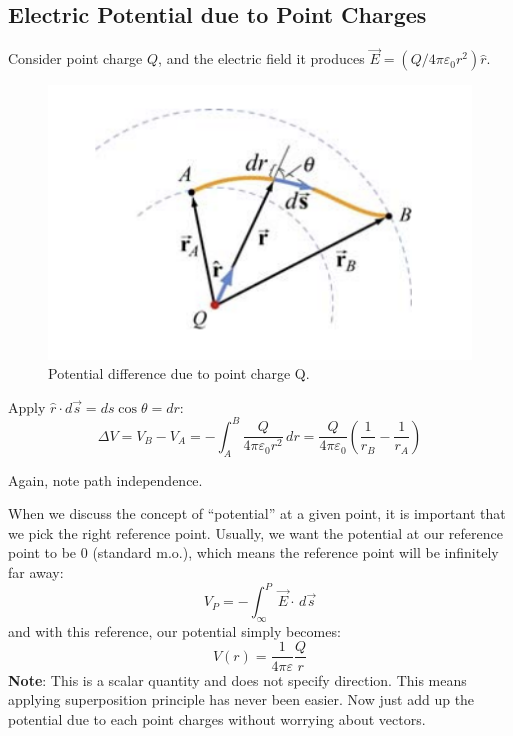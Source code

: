 \documentclass[11pt, letterpaper]{article}
\begin{document}
	\subsection{Electric Potential due to Point Charges}
	Consider point charge $Q$, and the electric field it produces $\vec{E} = (Q/4\pi
	\varepsilon_0r^2)\hat{r}$. 
	\begin{figure}[h!]
		\centering
		\includegraphics[scale=0.8]{single-charge-pot}
		\caption{Potential difference due to point charge Q.}
	\end{figure}
	
	Apply $\hat{r}\cdot d\vec{s} = ds\cos{\theta} = dr$:
	\begin{equation}\label{eqn:point-chagre-pot}
		\boxed{\Delta V = V_B - V_A = -\int_A^B \frac{Q}{4\pi\varepsilon_0 r^2}\, dr = \frac{Q}{4\pi
		\varepsilon_0}\left(\frac{1}{r_B}-\frac{1}{r_A}\right)}
	\end{equation}
	
	Again, note path independence.
	
	When we discuss the concept of ``potential'' at a given point, it is important that we pick the
	right reference point. Usually, we want the potential at our reference point to be $0$ (standard
	m.o.), which means the reference point will be infinitely far away: \[V_P = -\int_\infty ^P \vec{E}
	\cdot\, d\vec{s}\] and with this reference, our potential simply becomes:
	\begin{equation}
		\boxed{V(r) = \frac{1}{4\pi\varepsilon}\frac{Q}{r}}
	\end{equation}
	\textbf{Note}: This is a scalar quantity and does not specify direction. This means applying 
	superposition principle has never been easier. Now just add up the potential due to each 
	point charges without worrying about vectors.
	\newpage
\end{document}
